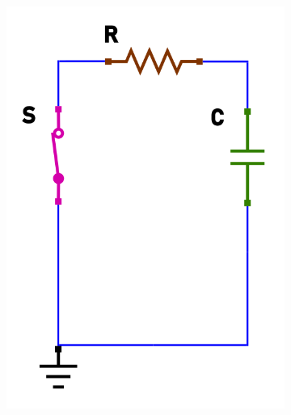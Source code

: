 \documentclass{article}
\begin{document}
\begin{figure}[h!]
\begin{subfigure}[b]{0.3\linewidth}
    \includegraphics[width=\linewidth]{data/scarica-closed.png}
  \end{subfigure}
  \begin{subfigure}[b]{0.347\linewidth}

\end{subfigure}
\end{figure}
\end{document}
